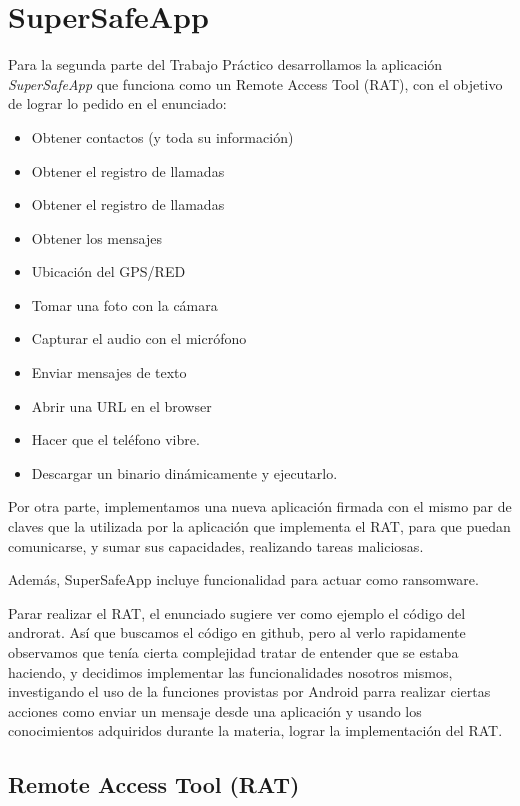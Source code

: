 \newpage
\section{SuperSafeApp}

Para la segunda parte del Trabajo Práctico desarrollamos la aplicación \emph{SuperSafeApp} que funciona como un Remote Access Tool (RAT), con el objetivo de lograr lo pedido en el enunciado:

\begin{itemize}
\item Obtener contactos (y toda su información)
\item Obtener el registro de llamadas
\item Obtener el registro de llamadas
\item Obtener los mensajes
\item Ubicación del GPS/RED
\item Tomar una foto con la cámara
\item Capturar el audio con el micrófono
\item Enviar mensajes de texto
\item Abrir una URL en el browser
\item Hacer que el teléfono vibre.
\item Descargar un binario dinámicamente y ejecutarlo.
\end{itemize}

Por otra parte, implementamos una nueva aplicación firmada con el mismo par de claves que la utilizada por la aplicación que implementa el RAT, para que puedan comunicarse, y sumar sus capacidades, realizando tareas maliciosas.

Además, SuperSafeApp incluye funcionalidad para actuar como ransomware.

Parar realizar el RAT, el enunciado sugiere ver como ejemplo el código del androrat. Así que buscamos el código en github, pero al verlo rapidamente observamos que tenía cierta complejidad tratar de entender que se estaba haciendo, y decidimos implementar las funcionalidades nosotros mismos, investigando el uso de la funciones provistas por Android parra realizar ciertas acciones como enviar un mensaje desde una aplicación y usando los conocimientos adquiridos durante la materia, lograr la implementación del RAT.

\subsection{Remote Access Tool (RAT)}

